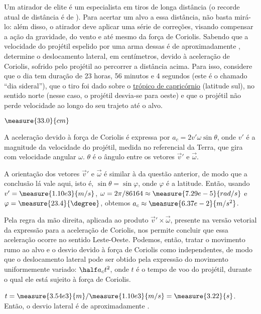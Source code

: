 \begin{question}
    Um atirador de elite é um especialista em tiros de longa distância (o recorde atual de distância é de ).
    Para acertar um alvo a essa distância, não basta mirá-lo: além disso, o atirador deve aplicar uma série de correções, visando compensar a ação da gravidade, do vento e até mesmo da força de Coriolis.
    Sabendo que a velocidade do projétil espelido por uma arma dessas é de aproximadamente , determine o deslocamento lateral, em centímetros, devido à aceleração de Coriolis, sofrido pelo projétil ao percorrer a distância acima.
    Para isso, considere que o dia tem duração de 23 horas, 56 minutos e 4 segundos (este é o chamado ``dia sideral''), que o tiro foi dado sobre o \href{https://pt.wikipedia.org/wiki/Tr\%C3\%B3pico_de_Capric\%C3\%B3rnio}{trópico de capricórnio} (latitude  sul), no sentido norte (nesse caso, o projétil desvia-se para oeste) e que o projétil não perde velocidade ao longo do seu trajeto até o alvo.

    \begin{answer}
      $\measure{33.0}{cm}$
    \end{answer}

    \begin{solution}
      A aceleração devido à força de Coriolis é expressa por $a_c = 2v'\omega \sin\theta$, onde $v'$ é a magnitude da velocidade do projétil, medida no referencial da Terra, que gira com velocidade angular $\omega$.
      $\theta$ é o ângulo entre os vetores $\vec v'$ e $\vec\omega$.

      A orientação dos vetores $\vec v'$ e $\vec\omega$ é similar à da questão anterior, de modo que a conclusão lá vale aqui, isto é, $\sin\theta = \sin\varphi$, onde $\varphi$ é a latitude.
      Então, usando $v' = \measure{1.10e3}{m/s}$, $\omega = 2\pi/86164 \approx \measure{7.29e-5}{rad/s}$ e $\varphi = \measure{23.4}{\degree}$, obtemos $a_c \approx \measure{6.37e-2}{m/s^2}$.

      Pela regra da mão direita, aplicada ao produto $\vec v'\times \vec\omega$, presente na versão vetorial da expressão para a aceleração de Coriolis, nos permite concluir que essa aceleração ocorre no sentido Leste-Oeste.
      Podemos, então, tratar o movimento rumo ao alvo e o desvio devido à força de Coriolis como independentes, de modo que o deslocamento lateral pode ser obtido pela expressão do movimento uniformemente variado: $\half a_c t^2$, onde $t$ é o tempo de voo do projétil, durante o qual ele está sujeito à força de Coriolis.

      $t = \measure{3.54e3}{m}/\measure{1.10e3}{m/s} = \measure{3.22}{s}$.
      Então, o desvio lateral é de aproximadamente .
    \end{solution}
\end{question}  